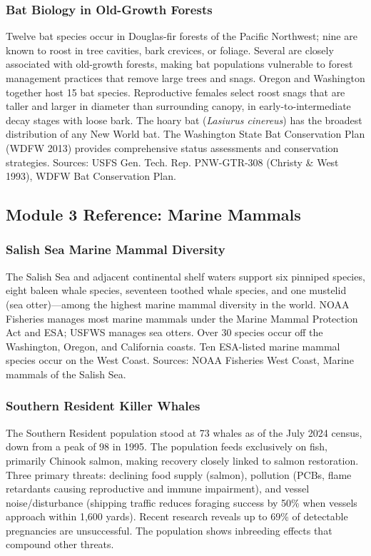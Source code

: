 \documentclass[11pt,letterpaper]{article}
\begin{document}
\subsubsection{Bat Biology in Old-Growth Forests}
Twelve bat species occur in Douglas-fir forests of the Pacific Northwest; nine are known to roost in tree cavities, bark crevices, or foliage. Several are closely associated with old-growth forests, making bat populations vulnerable to forest management practices that remove large trees and snags. Oregon and Washington together host 15 bat species. Reproductive females select roost snags that are taller and larger in diameter than surrounding canopy, in early-to-intermediate decay stages with loose bark. The hoary bat (\textit{Lasiurus cinereus}) has the broadest distribution of any New World bat. The Washington State Bat Conservation Plan (WDFW 2013) provides comprehensive status assessments and conservation strategies. Sources: USFS Gen. Tech. Rep. PNW-GTR-308 (Christy \& West 1993), WDFW Bat Conservation Plan.

\subsection{Module 3 Reference: Marine Mammals}

\subsubsection{Salish Sea Marine Mammal Diversity}
The Salish Sea and adjacent continental shelf waters support six pinniped species, eight baleen whale species, seventeen toothed whale species, and one mustelid (sea otter)---among the highest marine mammal diversity in the world. NOAA Fisheries manages most marine mammals under the Marine Mammal Protection Act and ESA; USFWS manages sea otters. Over 30 species occur off the Washington, Oregon, and California coasts. Ten ESA-listed marine mammal species occur on the West Coast. Sources: NOAA Fisheries West Coast, Marine mammals of the Salish Sea.

\subsubsection{Southern Resident Killer Whales}
The Southern Resident population stood at 73 whales as of the July 2024 census, down from a peak of 98 in 1995. The population feeds exclusively on fish, primarily Chinook salmon, making recovery closely linked to salmon restoration. Three primary threats: declining food supply (salmon), pollution (PCBs, flame retardants causing reproductive and immune impairment), and vessel noise/disturbance (shipping traffic reduces foraging success by 50\% when vessels approach within 1,600 yards). Recent research reveals up to 69\% of detectable pregnancies are unsuccessful. The population shows inbreeding effects that compound other threats.
\end{document}

